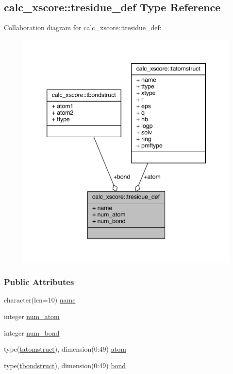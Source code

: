 \hypertarget{structcalc__xscore_1_1tresidue__def}{\subsection{calc\-\_\-xscore\-:\-:tresidue\-\_\-def Type Reference}
\label{structcalc__xscore_1_1tresidue__def}
}


Collaboration diagram for calc\-\_\-xscore\-:\-:tresidue\-\_\-def\-:
\nopagebreak
\begin{figure}[H]
\begin{center}
\leavevmode
\includegraphics[width=346pt]{structcalc__xscore_1_1tresidue__def__coll__graph}
\end{center}
\end{figure}
\subsubsection*{Public Attributes}
\begin{DoxyCompactItemize}
\item 
character(len=10) \hyperlink{structcalc__xscore_1_1tresidue__def_af8eaa149eb978198ac39c417bb57dc41}{name}
\item 
integer \hyperlink{structcalc__xscore_1_1tresidue__def_a135587d01a81b8e2064b60ef0cac1072}{num\-\_\-atom}
\item 
integer \hyperlink{structcalc__xscore_1_1tresidue__def_a7d8d3858e156dbb9a37592e0eb877209}{num\-\_\-bond}
\item 
type(\hyperlink{structcalc__xscore_1_1tatomstruct}{tatomstruct}), dimension(0\-:49) \hyperlink{structcalc__xscore_1_1tresidue__def_a7b9f128e97673abf781c5ad5f8f42fa7}{atom}
\item 
type(\hyperlink{structcalc__xscore_1_1tbondstruct}{tbondstruct}), dimension(0\-:49) \hyperlink{structcalc__xscore_1_1tresidue__def_a4406a96ef4c74040c5780112ace7e998}{bond}
\end{DoxyCompactItemize}


